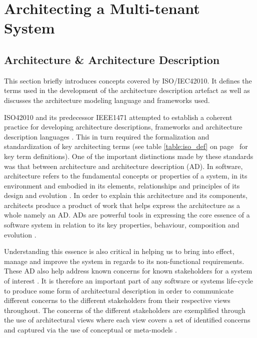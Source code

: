 \chapter{Architecting a Multi-tenant System}

\section{Architecture \& Architecture Description}
This section briefly introduces concepts covered by ISO/IEC42010. It defines the terms used in the development of the architecture description artefact as well as discusses the architecture modeling language and frameworks used.


ISO42010 and its predecessor IEEE1471 attempted to establish a coherent practice for developing architecture descriptions, frameworks and architecture description languages \cite{InternationalOrganizationOfStandardization2011}. This in turn required the formalization and standardization of key architecting terms (see table \ref{table:iso_def} on page~\pageref{table:iso_def} for key term definitions). One of the important distinctions made by these standards was that between architecture and architecture description (AD). In software, architecture refers to the fundamental concepts or properties of a system, in its environment and embodied in its elements, relationships and principles of its design and evolution \cite{InternationalOrganizationOfStandardization2011}. In order to explain this architecture and its components, architects produce a product of work that helps express the architecture as a whole namely an AD. ADs are powerful tools in expressing the core essence of a software system in relation to its key properties, behaviour, composition and evolution \cite{InternationalOrganizationOfStandardization2011}. 

Understanding this essence is also critical in helping us to bring into effect, manage and improve the system in regards to its non-functional requirements. These AD also help address known concerns for known stakeholders for a system of interest \cite{Emery2009}. It is therefore an important part of any software or systems life-cycle to produce some form of architectural description in order to communicate different concerns to the different stakeholders from their respective views throughout. The concerns of the different stakeholders are exemplified through the use of architectural views where each view covers a set of identified concerns and captured via the use of conceptual or meta-models \cite{42010faq}.


